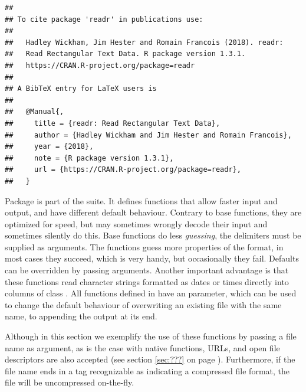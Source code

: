 \documentclass[krantz2]{krantz}\usepackage{knitr}%
\begin{document}
\begin{knitrout}\footnotesize
{}\color{fgcolor}\begin{kframe}
\begin{alltt}
\hlstd{(} \hlstd{=} \hlstd{)}
\end{alltt}
\begin{verbatim}
## 
## To cite package 'readr' in publications use:
## 
##   Hadley Wickham, Jim Hester and Romain Francois (2018). readr:
##   Read Rectangular Text Data. R package version 1.3.1.
##   https://CRAN.R-project.org/package=readr
## 
## A BibTeX entry for LaTeX users is
## 
##   @Manual{,
##     title = {readr: Read Rectangular Text Data},
##     author = {Hadley Wickham and Jim Hester and Romain Francois},
##     year = {2018},
##     note = {R package version 1.3.1},
##     url = {https://CRAN.R-project.org/package=readr},
##   }
\end{verbatim}
\end{kframe}
\end{knitrout}

Package  is part of the  suite. It defines functions that allow faster input and output, and have different default behaviour. Contrary to base \Rlang functions, they are optimized for speed, but may sometimes wrongly decode their input and sometimes silently do this. Base \Rlang functions do less \emph{guessing}, the delimiters must be supplied as arguments. The  functions guess more properties of the format, in most cases they succeed, which is very handy, but occasionally they fail. Defaults can be overridden by passing arguments. Another important advantage is that these functions read character strings formatted as dates or times directly into columns of class . All  functions defined in  have an  parameter, which can be used to change the default behaviour of overwriting an existing file with the same name, to appending the output at its end.

Although in this section we exemplify the use of these functions by passing a file name as argument, as is the case with \Rlang native functions, URLs, and open file descriptors are also accepted (see section \ref{sec:???} on page \pageref{sec:???}). Furthermore, if the file name ends in a tag recognizable as indicating a compressed file format, the file will be uncompressed on-the-fly.
\end{document}
